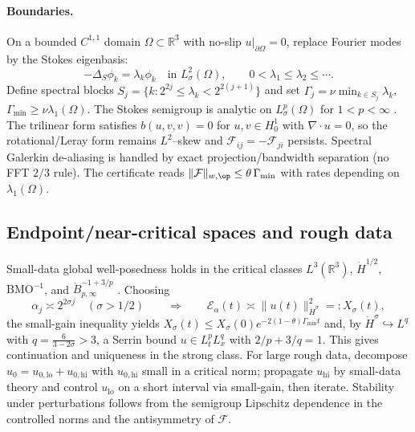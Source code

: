 \IfFileExists{nyjm.cls}{\documentclass[11pt]{nyjm}}{\documentclass[11pt]{amsart}}
\newcommand{\R}{\mathbb{R}}
\theoremstyle{plain}
\theoremstyle{definition}
\theoremstyle{remark}
\begin{document}
\paragraph{Boundaries.}
On a bounded $C^{1,1}$ domain $\Omega\subset\R^3$ with no-slip $u|_{\partial\Omega}=0$, replace Fourier modes by the Stokes eigenbasis:
\[
-\Delta_S\phi_k=\lambda_k\phi_k\quad\text{in }L^2_\sigma(\Omega),\qquad 0<\lambda_1\le\lambda_2\le\cdots.
\]
Define spectral blocks $S_j=\{k:2^{2j}\le \lambda_k<2^{2(j+1)}\}$ and set $\Gamma_j=\nu\min_{k\in S_j}\lambda_k$, $\Gamma_{\min}\ge\nu\lambda_1(\Omega)$. The Stokes semigroup is analytic on $L^p_\sigma(\Omega)$ for $1<p<\infty$ \cite{Sohr2001,Temam2001}. The trilinear form satisfies $b(u,v,v)=0$ for $u,v\in H^1_0$ with $\nabla\!\cdot u=0$, so the rotational/Leray form remains $L^2$–skew and $\mathcal F_{ij}=-\mathcal F_{ji}$ persists. Spectral Galerkin de-aliasing is handled by exact projection/bandwidth separation (no FFT $2/3$ rule). The certificate reads $\|\mathcal F\|_{w,\op}\le \theta\,\Gamma_{\min}$ with rates depending on $\lambda_1(\Omega)$.

\subsection{Endpoint/near-critical spaces and rough data}\label{subsec:endpoint-rough}
Small-data global well-posedness holds in the critical classes $L^3(\R^3)$, $\dot H^{1/2}$, $\mathrm{BMO}^{-1}$, and $\dot B^{-1+3/p}_{p,\infty}$ \cite{Kato1984,Cannone1995,KochTataru2001,Lemarie2002}. Choosing
\[
\alpha_j\asymp 2^{2\sigma j}\quad(\sigma>1/2)\qquad\Longrightarrow\qquad
\mathcal E_\alpha(t)\asymp \|u(t)\|_{\dot H^\sigma}^2=:X_\sigma(t),
\]
the small-gain inequality yields $X_\sigma(t)\le X_\sigma(0)e^{-2(1-\theta)\Gamma_{\min}t}$ and, by $\dot H^\sigma\hookrightarrow L^q$ with $q=\frac{6}{3-2\sigma}>3$, a Serrin bound $u\in L^p_tL^q_x$ with $2/p+3/q=1$. This gives continuation and uniqueness in the strong class.
For large rough data, decompose $u_0=u_{0,\mathrm{lo}}+u_{0,\mathrm{hi}}$ with $u_{0,\mathrm{hi}}$ small in a critical norm; propagate $u_{\mathrm{hi}}$ by small-data theory and control $u_{\mathrm{lo}}$ on a short interval via small-gain, then iterate. Stability under perturbations follows from the semigroup Lipschitz dependence in the controlled norms and the antisymmetry of $\mathcal F$.
\end{document}
